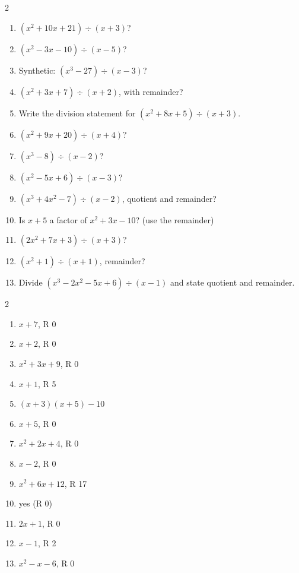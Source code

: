 \documentclass[11pt]{article}
\begin{document}
\begin{recapbox}
\begin{multicols}{2}
\small
\begin{enumerate}[leftmargin=*,itemsep=3pt]
  \item $(x^2+10x+21)\div(x+3)$?
  \item $(x^2-3x-10)\div(x-5)$?
  \item Synthetic: $(x^3-27)\div(x-3)$?
  \item $(x^2+3x+7)\div(x+2)$, with remainder?
  \item Write the division statement for $(x^2+8x+5)\div(x+3)$.
  \item $(x^2+9x+20)\div(x+4)$?
  \item $(x^3-8)\div(x-2)$?
  \item $(x^2-5x+6)\div(x-3)$?
  \item $(x^3+4x^2-7)\div(x-2)$, quotient and remainder?
  \item Is $x+5$ a factor of $x^2+3x-10$? (use the remainder)
  \item $(2x^2+7x+3)\div(x+3)$?
  \item $(x^2+1)\div(x+1)$, remainder?
  \item Divide $(x^3-2x^2-5x+6)\div(x-1)$ and state quotient and remainder.
\end{enumerate}
\end{multicols}
\end{recapbox}

\begin{keybox}
\begin{multicols}{2}
\small
\begin{enumerate}[leftmargin=*,itemsep=3pt]
  \item $x+7$, R 0
  \item $x+2$, R 0
  \item $x^2+3x+9$, R 0
  \item $x+1$, R 5
  \item $(x+3)(x+5)-10$
  \item $x+5$, R 0
  \item $x^2+2x+4$, R 0
  \item $x-2$, R 0
  \item $x^2+6x+12$, R 17
  \item yes (R 0)
  \item $2x+1$, R 0
  \item $x-1$, R 2
  \item $x^2-x-6$, R 0
\end{enumerate}
\end{multicols}
\end{keybox}
\end{document}
